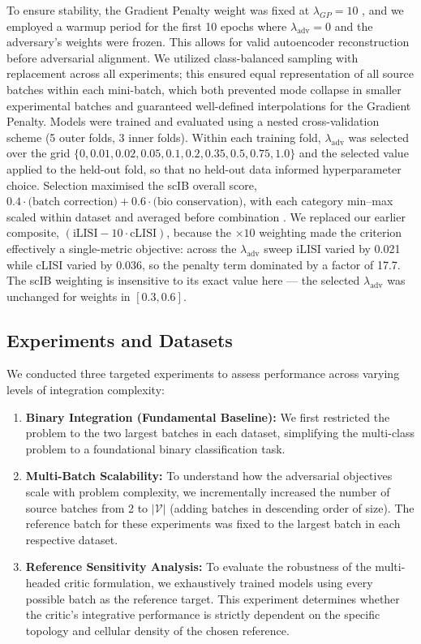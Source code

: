 \documentclass[unnumsec,webpdf,contemporary,large]{oup-authoring-template}%
\theoremstyle{thmstyleone}%
\theoremstyle{thmstyletwo}%
\theoremstyle{thmstylethree}%
\begin{document}
To ensure stability, the Gradient Penalty weight was fixed at $\lambda_{GP}=10$ \citep{10.5555/3295222.3295327}, and we employed a warmup period for the first 10 epochs where $\lambda_{\text{adv}}=0$ and the adversary's weights were frozen. This allows for valid autoencoder reconstruction before adversarial alignment. We utilized class-balanced sampling with replacement across all experiments; this ensured equal representation of all source batches within each mini-batch, which both prevented mode collapse in smaller experimental batches and guaranteed well-defined interpolations for the Gradient Penalty. Models were trained and evaluated using a nested cross-validation scheme (5 outer folds, 3 inner folds). Within each training fold, $\lambda_{\text{adv}}$ was selected over the grid $\{0, 0.01, 0.02, 0.05, 0.1, 0.2, 0.35, 0.5, 0.75, 1.0\}$ and the selected value applied to the held-out fold, so that no held-out data informed hyperparameter choice. Selection maximised the scIB overall score, $0.4 \cdot \text{(batch correction)} + 0.6 \cdot \text{(bio conservation)}$, with each category min--max scaled within dataset and averaged before combination \citep{Luecken2022-fb}. We replaced our earlier composite, $(\text{iLISI} - 10 \cdot \text{cLISI})$, because the $\times 10$ weighting made the criterion effectively a single-metric objective: across the $\lambda_{\text{adv}}$ sweep iLISI varied by 0.021 while cLISI varied by 0.036, so the penalty term dominated by a factor of 17.7. The scIB weighting is insensitive to its exact value here --- the selected $\lambda_{\text{adv}}$ was unchanged for weights in $[0.3, 0.6]$.

\subsection{Experiments and Datasets}
We conducted three targeted experiments to assess performance across varying levels of integration complexity:

\begin{enumerate}
    \item \textbf{Binary Integration (Fundamental Baseline):} We first restricted the problem to the two largest batches in each dataset, simplifying the multi-class problem to a foundational binary classification task.
    \item \textbf{Multi-Batch Scalability:} To understand how the adversarial objectives scale with problem complexity, we incrementally increased the number of source batches from 2 to $\lvert \mathcal{V} \rvert$ (adding batches in descending order of size). The reference batch for these experiments was fixed to the largest batch in each respective dataset.
    \item \textbf{Reference Sensitivity Analysis:} To evaluate the robustness of the multi-headed critic formulation, we exhaustively trained models using every possible batch as the reference target. This experiment determines whether the critic's integrative performance is strictly dependent on the specific topology and cellular density of the chosen reference.
\end{enumerate}
    
\end{document}
